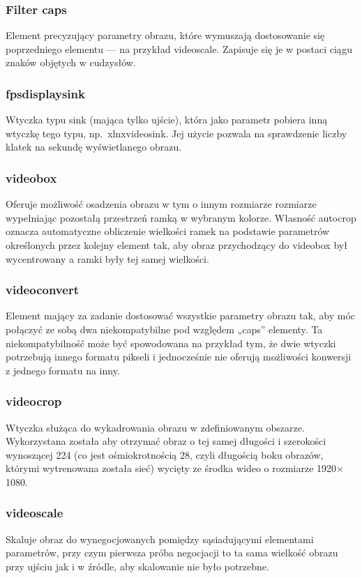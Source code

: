 \documentclass[12pt, oneside, a4paper]{article}
\begin{document}
\subsubsection{Filter caps}
Element precyzujący parametry obrazu, które wymuszają
dostosowanie się poprzedniego elementu --- na przykład videoscale.
Zapisuje się je w postaci ciągu znaków objętych w cudzysłów.

\subsubsection{fpsdisplaysink}
Wtyczka typu sink (mająca tylko ujście), która jako parametr
pobiera inną wtyczkę tego typu, np.~xlnxvideosink. Jej użycie
pozwala na sprawdzenie liczby klatek na sekundę wyświetlanego
obrazu.

\subsubsection{videobox}
Oferuje możliwość osadzenia obrazu w tym o innym rozmiarze
rozmiarze wypełniając pozostałą przestrzeń ramką
w wybranym kolorze. Własność autocrop oznacza automatyczne obliczenie
wielkości ramek na podstawie parametrów określonych przez kolejny element tak,
aby obraz przychodzący do videobox był wycentrowany a ramki
były tej samej wielkości.

\subsubsection{videoconvert}
Element mający za zadanie dostosować wszystkie parametry obrazu tak,
aby móc połączyć ze sobą dwa niekompatybilne pod względem „caps” elementy.
Ta niekompatybilność może być spowodowana na przykład tym, że dwie
wtyczki potrzebują innego formatu pikseli i jednocześnie nie oferują
możliwości konwersji z jednego formatu na inny.

\subsubsection{videocrop}
Wtyczka służąca do wykadrowania obrazu w zdefiniowanym obszarze.
Wykorzystana została aby otrzymać obraz o tej samej długości
i szerokości wynoszącej 224 (co jest ośmiokrotnością 28, czyli
długością boku obrazów, którymi wytrenowana została sieć) wycięty
ze środka wideo o rozmiarze 1920\(\times \)1080.

\subsubsection{videoscale}
Skaluje obraz do wynegocjowanych pomiędzy sąsiadującymi elementami
parametrów, przy czym pierwsza próba negocjacji to ta sama wielkość
obrazu przy ujściu jak i w źródle, aby skalowanie nie było potrzebne.
\end{document}

